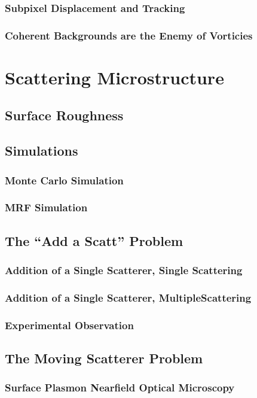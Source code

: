 \documentclass[a4paper,titlepage,onecolumn]{report}
\begin{document}
  \subsection{Subpixel Displacement and Tracking}
  \subsection{Coherent Backgrounds are the Enemy of Vorticies}

\chapter{Scattering Microstructure} \label{ch:scattmicro}
 \section{Surface Roughness}
 \section{Simulations}
  \subsection{Monte Carlo Simulation}
  \subsection{MRF Simulation}
 \section{The ``Add a Scatt'' Problem}
  \subsection{Addition of a Single Scatterer, Single Scattering}
  \subsection{Addition of a Single Scatterer, MultipleScattering}
  \subsection{Experimental Observation}
 \section{The Moving Scatterer Problem}
  \subsection{Surface Plasmon Nearfield Optical Microscopy}
\end{document}
